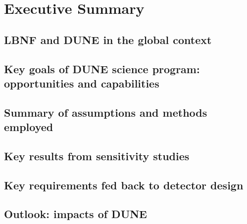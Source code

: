 \chapter{Executive Summary}
\label{ch:exec-summ}

\section{LBNF and DUNE in the global context}
\label{sec:exec-glob-context}


\section{Key goals of DUNE science program: opportunities and capabilities}
\label{sec:exec-key-goals}


\section{Summary of assumptions and methods employed}
\label{sec:exec-assm-meth}



\section{Key results from sensitivity studies}
\label{sec:exec-sensitiv-results}



\section{Key requirements fed back to detector design}
\label{sec:exec-key-reqs}



\section{Outlook: impacts of DUNE}
\label{sec:exec-impacts}